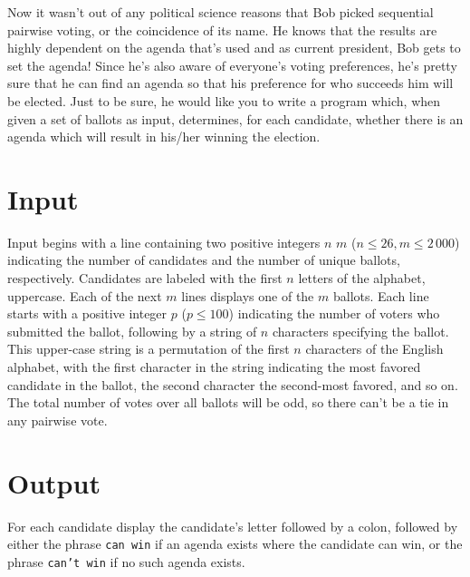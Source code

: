 Now it wasn't out of any political science reasons that Bob picked sequential pairwise voting, or the coincidence of its name.  He knows that the results are highly dependent on the agenda that's used and as current president, Bob gets to set the agenda!  Since he's also aware of everyone's voting preferences, he's pretty sure that he can find an agenda so that his preference  for who succeeds him will be elected.  Just to be sure, he would like you to write a program which, when given a set of ballots as input, determines, for each candidate, whether there is an agenda which will result in his/her winning the election.

\section*{Input}
Input begins with a line containing two positive integers $n$ $m$ ($n \leq 26, m \leq 2\,000$) indicating the number of candidates and the number of unique ballots, respectively.  Candidates are labeled with the first $n$ letters of the alphabet, uppercase.  Each of the next $m$ lines  displays one of the $m$ ballots.  Each line starts with a positive integer $p$ ($p \leq 100$) indicating the number of voters who submitted the ballot, following by a string of $n$ characters specifying the ballot.  This upper-case string is a permutation of the first $n$ characters of the English alphabet, with the first character in the string indicating the most favored candidate in the ballot, the second character the second-most favored, and so on.  The total number of votes over all ballots will be odd, so there can't be a tie in any pairwise vote.

\section*{Output}
For each candidate display the candidate's letter followed by a colon, followed by either the phrase {\tt can win} if an agenda exists where the candidate can win, or the phrase {\tt can't win} if no such agenda exists.  
